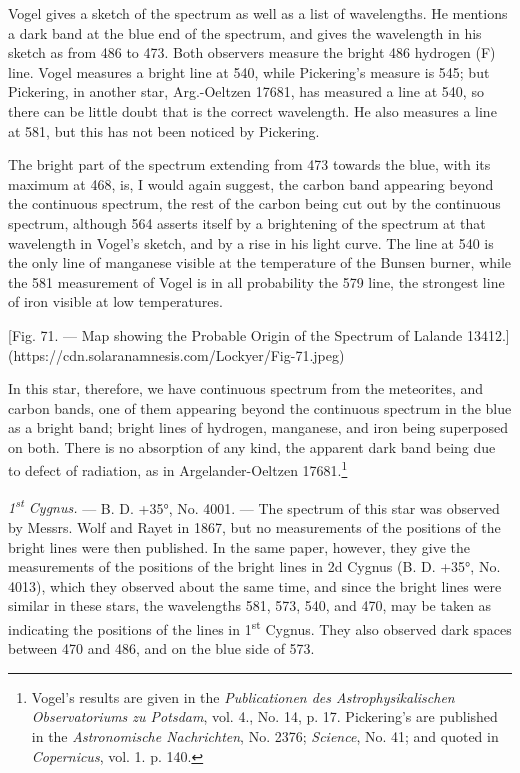 \documentclass[a4paper, 12pt, oneside, polutonikogreek, english]{article}
\begin{document}
Vogel gives a sketch of the spectrum as well as a list of wavelengths. He mentions a dark band at the blue end of the spectrum, and gives the wavelength in his sketch as from 486 to 473. Both observers measure the bright 486 hydrogen (F) line. Vogel measures a bright line at 540, while Pickering's measure is 545; but Pickering, in another star, Arg.-Oeltzen 17681, has measured a line at 540, so there can be little doubt that is the correct wavelength. He also measures a line at 581, but this has not been noticed by Pickering.

The bright part of the spectrum extending from 473 towards the blue, with its maximum at 468, is, I would again suggest, the carbon band appearing beyond the continuous spectrum, the rest of the carbon being cut out by the continuous spectrum, although 564 asserts itself by a brightening of the spectrum at that wavelength in Vogel's sketch, and by a rise in his light curve. The line at 540 is the only line of manganese visible at the temperature of the Bunsen burner, while the 581 measurement of Vogel is in all probability the 579 line, the strongest line of iron visible at low temperatures.

[Fig. 71. --- Map showing the Probable Origin of the Spectrum of Lalande 13412.](https://cdn.solaranamnesis.com/Lockyer/Fig-71.jpeg)

In this star, therefore, we have continuous spectrum from the meteorites, and carbon bands, one of them appearing beyond the continuous spectrum in the blue as a bright band; bright lines of hydrogen, manganese, and iron being superposed on both. There is no absorption of any kind, the apparent dark band being due to defect of radiation, as in Argelander-Oeltzen 17681.\footnote{Vogel's results are given in the \emph{Publicationen des Astrophysikalischen Observatoriums zu Potsdam}, vol. 4., No. 14, p. 17. Pickering's are published in the \emph{Astronomische Nachrichten}, No. 2376; \emph{Science}, No. 41; and quoted in \emph{Copernicus}, vol. 1. p. 140.}

\emph{1\textsuperscript{st} Cygnus.} --- B. D. +35°, No. 4001. --- The spectrum of this star was observed by Messrs. Wolf and Rayet in 1867, but no measurements of the positions of the bright lines were then published. In the same paper, however, they give the measurements of the positions of the bright lines in 2d Cygnus (B. D. +35°, No. 4013), which they observed about the same time, and since the bright lines were similar in these stars, the wavelengths 581, 573, 540, and 470, may be taken as indicating the positions of the lines in 1\textsuperscript{st} Cygnus. They also observed dark spaces between 470 and 486, and on the blue side of 573.
\end{document}

